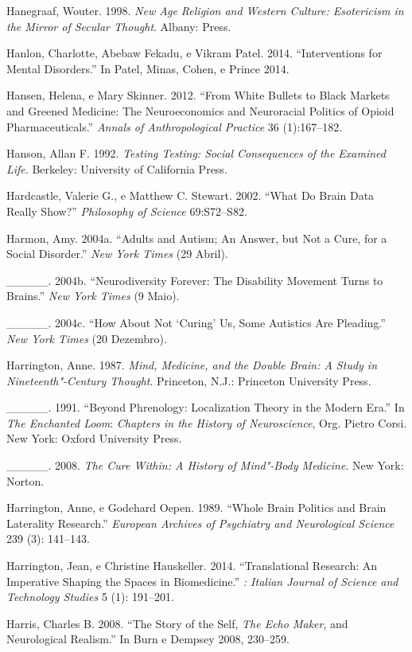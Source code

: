 {\begin{Parskip}
Hanegraaf, Wouter. 1998. \emph{New Age Religion and Western Culture:
Esotericism in the Mirror of Secular Thought}. Albany:  Press.

Hanlon, Charlotte, Abebaw Fekadu, e Vikram Patel. 2014. ``Interventions
for Mental Disorders.'' In Patel, Minas, Cohen, e Prince 2014.

Hansen, Helena, e Mary Skinner. 2012. ``From White Bullets to Black
Markets and Greened Medicine: The Neuroeconomics and Neuroracial
Politics of Opioid Pharmaceuticals.'' \emph{Annals of Anthropological
Practice} 36 (1):167--182.

Hanson, Allan F. 1992. \emph{Testing Testing: Social Consequences of the
Examined Life}. Berkeley: University of California Press.

Hardcastle, Valerie G., e Matthew C. Stewart. 2002. ``What Do Brain Data
Really Show?'' \emph{Philosophy of Science} 69:S72--S82.

Harmon, Amy. 2004a. ``Adults and Autism; An Answer, but Not a Cure, for
a Social Disorder.'' \emph{New York Times} (29 Abril).

\_\_\_\_\_. 2004b. ``Neurodiversity Forever: The Disability Movement
Turns to Brains.'' \emph{New York Times} (9 Maio).

\_\_\_\_\_. 2004c. ``How About Not `Curing' Us, Some Autistics Are
Pleading.'' \emph{New York Times} (20 Dezembro).

Harrington, Anne. 1987. \emph{Mind, Medicine, and the Double Brain: A
Study in Nineteenth"-Century Thought}. Princeton, N.J.: Princeton
University Press.

\_\_\_\_\_. 1991. ``Beyond Phrenology: Localization Theory in the Modern
Era.'' In \emph{The Enchanted Loom}: \emph{Chapters in the History of
Neuroscience}, Org. Pietro Corsi. New York: Oxford University Press.

\_\_\_\_\_. 2008. \emph{The Cure Within: A History of Mind"-Body
Medicine}. New York: Norton.

Harrington, Anne, e Godehard Oepen. 1989. ``Whole Brain Politics and
Brain Laterality Research.'' \emph{European Archives of Psychiatry and
Neurological Science} 239 (3): 141--143.

Harrington, Jean, e Christine Hauskeller. 2014. ``Translational
Research: An Imperative Shaping the Spaces in Biomedicine.''
\emph{: Italian Journal of Science and Technology Studies} 5
(1): 191--201.

Harris, Charles B. 2008. ``The Story of the Self, \emph{The Echo Maker},
and Neurological Realism.'' In Burn e Dempsey 2008, 230--259.


\end{Parskip}}
